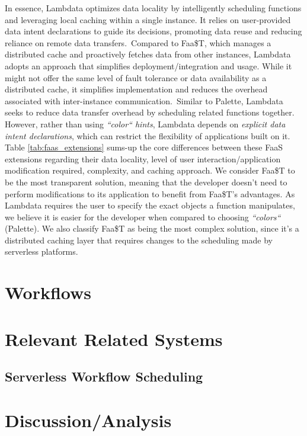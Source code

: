 In essence, Lambdata optimizes data locality by intelligently scheduling functions and leveraging local caching within a single instance. It relies on user-provided data intent declarations to guide its decisions, promoting data reuse and reducing reliance on remote data transfers.\
Compared to Faa\$T, which manages a distributed cache and proactively fetches data from other instances, Lambdata adopts an approach that simplifies deployment/integration and usage. While it might not offer the same level of fault tolerance or data availability as a distributed cache, it simplifies implementation and reduces the overhead associated with inter-instance communication.\
Similar to Palette, Lambdata seeks to reduce data transfer overhead by scheduling related functions together. However, rather than using \textit{``color`` hints}, Lambdata depends on \textit{explicit data intent declarations}, which can restrict the flexibility of applications built on it.\\

Table \ref{tab:faas_extensions} sums-up the core differences between these FaaS extensions regarding their data locality, level of user interaction/application modification required, complexity, and caching approach. We consider Faa\$T to be the most transparent solution, meaning that the developer doesn't need to perform modifications to its application to benefit from Faa\$T's advantages. As Lambdata requires the user to specify the exact objects a function manipulates, we believe it is easier for the developer when compared to choosing \textit{``colors``} (Palette). We also classify Faa\$T as being the most complex solution, since it's a distributed caching layer that requires changes to the scheduling made by serverless platforms.


\section{Workflows}

\section{Relevant Related Systems}

\subsection{Serverless Workflow Scheduling}

\section{Discussion/Analysis}
